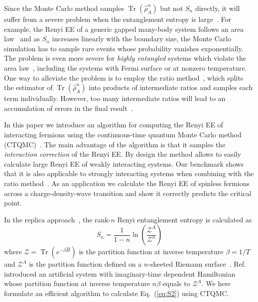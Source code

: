 \documentclass[12pt,onecolumn,english,prl,showpacs,nofootinbib]{revtex4-1}
\DeclareMathOperator{\Tr}{Tr}
\newcommand{\red}[1]{[{\bf \color{red}{#1}}]}
\begin{document}
Since the Monte Carlo method samples $\Tr (\hat{\rho}_{A}^{n})$ but not $S_{n}$ directly, it will suffer from a severe problem when the entanglement entropy is large~\cite{Hastings:2010dca, Zhang:2011ka, Grover:2013cs}. For example, the Renyi EE of a generic gapped many-body system follows an area law~\cite{Eisert:2010hq} and as $S_{n}$ increases linearly with the boundary size, the Monte Carlo simulation has to sample rare events whose probability vanishes exponentially. The problem is even more severe for \emph{highly entangled} systems which violate the area law~\cite{PhysRevLett.96.010404, PhysRevLett.96.100503, PhysRevLett.105.050502,PhysRevX.2.011012, PhysRevLett.111.210402,PhysRevLett.112.160403}, including the systems with Fermi surface or at nonzero temperature. One way to alleviate the problem is to employ the ratio method~\cite{Hastings:2010dca, Humeniuk:2012cq}, which splits the estimator of $\Tr(\hat{\rho}_{A}^{n})$ into products of intermediate ratios and samples each term individually. However, too many intermediate ratios will lead to an accumulation of errors in the final result~\cite{Humeniuk:2012cq}. 

In this paper we introduce an algorithm for computing the Renyi EE of interacting fermions using the continuous-time quantum Monte Carlo method (CTQMC)~\cite{Rubtsov:2005iw, Gull:2011jd}. The main advantage of the algorithm is that it samples the \emph{interaction correction} of the Renyi EE. By design the method allows to easily calculate large Renyi EE of  weakly interacting systems. Our benchmark shows that it is also applicable to strongly interacting systems when combining  with the ratio method~\cite{Hastings:2010dca, Humeniuk:2012cq}. As an application we calculate the Renyi EE of spinless fermions across a charge-density-wave transition and show it correctly predicts the critical point. 

In the replica approach~\cite{Calabrese:2004hl, Melko:2010jda}, the rank-$n$ Renyi entanglement entropy is calculated as 
\begin{equation}
S_{n} = \frac{1}{1-n}\ln\left(\frac{\mathcal{Z}^{A}}{\mathcal{Z}^{n}}\right)
\label{eq:S2}
\end{equation}
where $\mathcal{Z}= \Tr(e^{-\beta \hat{H}})$ is the partition 
function at inverse temperature $\beta=1/T$ and $\mathcal{Z}^{A}$ is the partition function defined on a $n$-sheeted Riemann surface~\cite{Melko:2010jda}. Ref.\cite{Broecker:2014ud} introduced an artificial system with imaginary-time dependent Hamiltonian whose partition function at inverse temperature $n\beta$ equals to $\mathcal{Z}^{A}$. We here formulate an efficient algorithm to calculate Eq.~({\ref{eq:S2}}) using CTQMC. 
\end{document}
